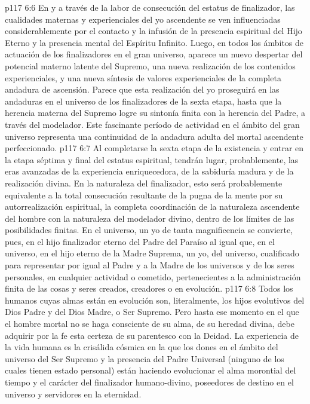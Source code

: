 \vs p117 6:6 En y a través de la labor de consecución del estatus de finalizador, las cualidades maternas y experienciales del yo ascendente se ven influenciadas considerablemente por el contacto y la infusión de la presencia espiritual del Hijo Eterno y la presencia mental del Espíritu Infinito. Luego, en todos los ámbitos de actuación de los finalizadores en el gran universo, aparece un nuevo despertar del potencial materno latente del Supremo, una nueva realización de los contenidos experienciales, y una nueva síntesis de valores experienciales de la completa andadura de ascensión. Parece que esta realización del yo proseguirá en las andaduras en el universo de los finalizadores de la sexta etapa, hasta que la herencia materna del Supremo logre su sintonía finita con la herencia del Padre, a través del modelador. Este fascinante período de actividad en el ámbito del gran universo representa una continuidad de la andadura adulta del mortal ascendente perfeccionado.
\vs p117 6:7 Al completarse la sexta etapa de la existencia y entrar en la etapa séptima y final del estatus espiritual, tendrán lugar, probablemente, las eras avanzadas de la experiencia enriquecedora, de la sabiduría madura y de la realización divina. En la naturaleza del finalizador, esto será probablemente equivalente a la total consecución resultante de la pugna de la mente por su autorrealización espiritual, la completa coordinación de la naturaleza ascendente del hombre con la naturaleza del modelador divino, dentro de los límites de las posibilidades finitas. En el universo, un yo de tanta magnificencia se convierte, pues, en el hijo finalizador eterno del Padre del Paraíso al igual que, en el universo, en el hijo eterno de la Madre Suprema, un yo, del universo, cualificado para representar por igual al Padre y a la Madre de los universos y de los seres personales, en cualquier actividad o cometido, pertenecientes a la administración finita de las cosas y seres creados, creadores o en evolución.
\vs p117 6:8 Todos los humanos cuyas almas están en evolución son, literalmente, los hijos evolutivos del Dios Padre y del Dios Madre, o Ser Supremo. Pero hasta ese momento en el que el hombre mortal no se haga consciente de su alma, de su heredad divina, debe adquirir por la fe esta certeza de su parentesco con la Deidad. La experiencia de la vida humana es la crisálida cósmica en la que los dones en el ámbito del universo del Ser Supremo y la presencia del Padre Universal (ninguno de los cuales tienen estado personal) están haciendo evolucionar el alma morontial del tiempo y el carácter del finalizador humano\hyp{}divino, poseedores de destino en el universo y servidores en la eternidad.
